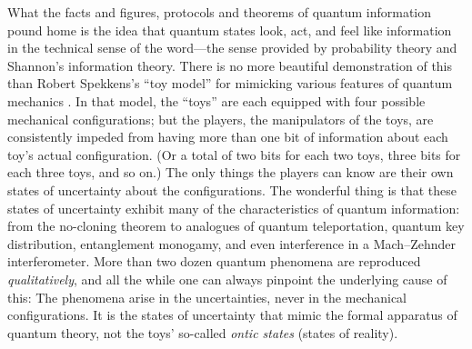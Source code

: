 \documentclass[aps,pra,superscriptaddress,12pt,tightenlines,nofootinbib]{revtex4-2}
\begin{document}
What the facts and figures, protocols and theorems of quantum information pound home is the idea that quantum states look, act, and feel like information in the technical sense of the word---the sense provided by probability theory and Shannon's information theory.  There is no more beautiful demonstration of this than Robert Spekkens's ``toy model'' for mimicking various features of quantum mechanics \cite{Spekkens07}.  In that model, the ``toys'' are each equipped with four possible mechanical configurations; but the players, the manipulators of the toys, are consistently impeded from having more than one bit of information about each toy's actual configuration. (Or a total of two bits for each two toys, three bits for each three toys, and so on.)  The only things the players can know are their own states of uncertainty about the configurations.  The wonderful thing is that these states of uncertainty exhibit many of the characteristics of quantum information: from the no-cloning theorem to analogues of quantum teleportation, quantum key distribution, entanglement monogamy, and even interference in a Mach--Zehnder interferometer.  More than two dozen quantum phenomena are reproduced {\it qualitatively}, and all the while one can always pinpoint the underlying cause of this:  The phenomena arise in the uncertainties, never in the mechanical configurations.  It is the states of uncertainty that mimic the formal apparatus of quantum theory, not the toys' so-called {\it ontic states\/} (states of reality).
\end{document}
